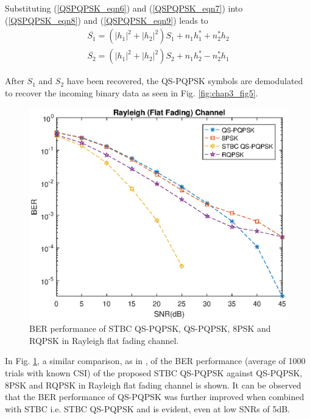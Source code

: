 Substituting (\ref{QSPQPSK_eqn6}) and (\ref{QSPQPSK_eqn7}) into (\ref{QSPQPSK_eqn8}) and (\ref{QSPQPSK_eqn9}) leads to
\begin{eqnarray} \label{QSPQPSK_eqn8}
\overline{S_1} = \left(\left|h_1\right|^2 + \left|h_2\right|^2\right)S_1 + n_1h_1^{\ast} + n_2^{\ast}h_2
\end{eqnarray}
\begin{eqnarray} \label{QSPQPSK_eqn9}
\overline{S_2} = \left(\left|h_1\right|^2 + \left|h_2\right|^2\right)S_2 + n_1h_2^{\ast} - n_2^{\ast}h_1
\end{eqnarray}

After $S_1$ and $S_2$ have been recovered, the QS-PQPSK symbols are demodulated to recover the incoming binary data as seen in Fig. \ref{fig:chap3_fig5}.

\begin{figure} []
\centering
\includegraphics [width=0.5\columnwidth]{chap3_fig/chap3_fig6.eps} 
\caption{BER performance of STBC QS-PQPSK, QS-PQPSK, 8PSK and
RQPSK in Rayleigh flat fading channel.}
\label{fig:chap3_fig6}
\end{figure}

In Fig. \ref{fig:chap3_fig6}, a similar comparison, as in \cite{tan2016quad}, of the BER performance (average of 1000 trials with known CSI) of the proposed STBC QS-PQPSK against QS-PQPSK, 8PSK and RQPSK \cite{liu1992rotative} in Rayleigh flat fading channel is shown. It can be observed that the BER performance of QS-PQPSK was further improved when combined with STBC i.e. STBC QS-PQPSK and is evident, even at low SNRs of 5dB.

